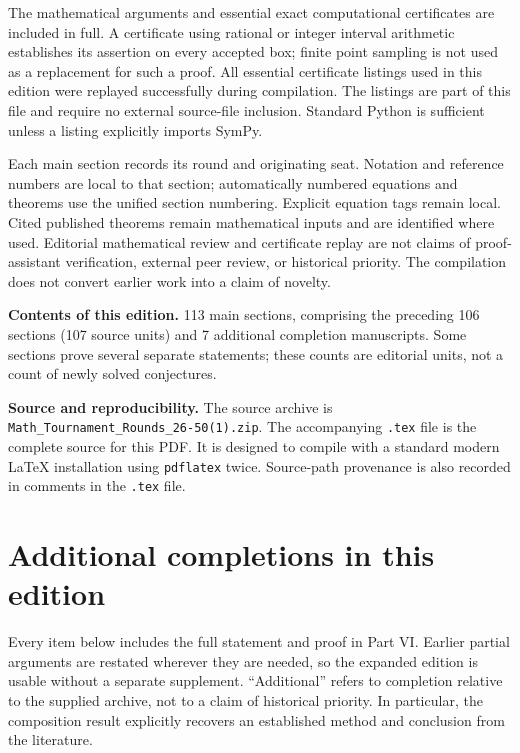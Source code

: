 \documentclass[11pt,a4paper]{article}
\numberwithin{equation}{section}
\theoremstyle{definition}
\theoremstyle{remark}
\begin{document}
The mathematical arguments and essential exact computational certificates are
included in full. A certificate using rational or integer interval arithmetic
establishes its assertion on every accepted box; finite point sampling is not
used as a replacement for such a proof. All essential certificate listings used
in this edition were replayed successfully during compilation. The listings are
part of this file and require no external source-file inclusion. Standard
Python is sufficient unless a listing explicitly imports SymPy.

Each main section records its round and originating seat. Notation and reference
numbers are local to that section; automatically numbered equations and theorems
use the unified section numbering. Explicit equation tags remain local.
Cited published theorems remain mathematical inputs and are
identified where used. Editorial mathematical review and certificate replay are
not claims of proof-assistant verification, external peer review, or historical
priority. The compilation does not convert earlier work into a claim of novelty.

\medskip
\noindent\textbf{Contents of this edition.} 113 main sections,
comprising the preceding 106 sections (107 source units) and 7 additional
completion manuscripts. Some sections prove several
separate statements; these counts are editorial units, not a count of newly
solved conjectures.

\medskip
\noindent\textbf{Source and reproducibility.} The source archive is
\texttt{Math\_Tournament\_Rounds\_26-50(1).zip}. The accompanying
\texttt{.tex} file is the complete source for this PDF. It is designed to compile
with a standard modern \LaTeX{} installation using \texttt{pdflatex} twice.
Source-path provenance is also recorded in comments in the \texttt{.tex} file.


\clearpage
\section*{Additional completions in this edition}
Every item below includes the full statement and proof in Part VI. Earlier
partial arguments are restated wherever they are needed, so the expanded
edition is usable without a separate supplement. ``Additional'' refers to
completion relative to the supplied archive, not to a claim of historical
priority. In particular, the composition result explicitly recovers an
established method and conclusion from the literature.
\end{document}

